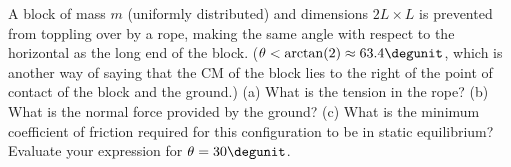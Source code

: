 %
A block of mass $m$ (uniformly distributed) and dimensions $2L \times
L$ is prevented from toppling over by a rope, making the same angle
with respect to the horizontal as the long end of the block. ($\theta
< \arctan(2) \approx 63.4\degunit$, which is another way of saying
that the CM of the block lies to the right of the point of contact of
the block and the ground.)
%
(a) What is the tension in the rope?\answercheck\hwendpart
%
(b) What is the normal force provided by the ground?\answercheck\hwendpart
%
(c) What is the minimum coefficient of friction required for this
configuration to be in static equilibrium? Evaluate your expression
for $\theta = 30\degunit$.\answercheck
